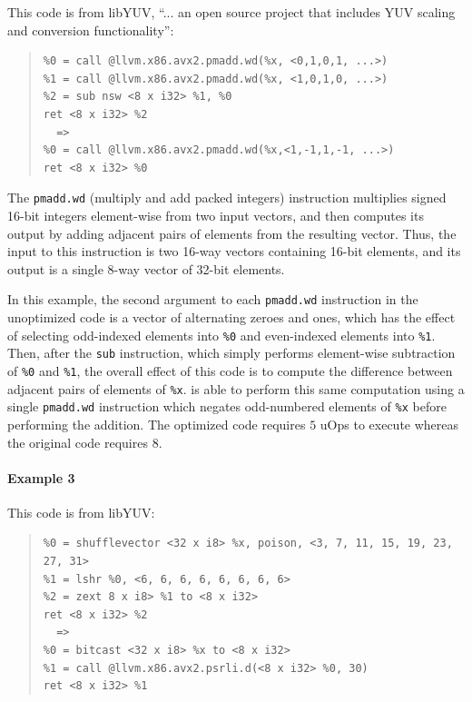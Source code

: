 This code is from libYUV, ``... an open source project that includes
YUV scaling and conversion
functionality'':

{\begin{quote}\begin{verbatim}
%0 = call @llvm.x86.avx2.pmadd.wd(%x, <0,1,0,1, ...>)
%1 = call @llvm.x86.avx2.pmadd.wd(%x, <1,0,1,0, ...>)
%2 = sub nsw <8 x i32> %1, %0
ret <8 x i32> %2
  =>
%0 = call @llvm.x86.avx2.pmadd.wd(%x,<1,-1,1,-1, ...>)
ret <8 x i32> %0
\end{verbatim}
\end{quote}}

The \texttt{pmadd.wd} (multiply and add packed integers) instruction multiplies
signed 16-bit integers element-wise from two input vectors, and then
computes its output by adding adjacent pairs of elements from the
resulting vector.
%
Thus, the input to this instruction is two 16-way vectors containing
16-bit elements, and its output is a single 8-way vector of 32-bit
elements.


In this example, the second argument to each \texttt{pmadd.wd}
instruction in the unoptimized code is a vector of alternating zeroes
and ones, which has the effect of selecting odd-indexed elements into
\texttt{\%0} and even-indexed elements into \texttt{\%1}.
%
Then, after the \texttt{sub} instruction, which simply performs
element-wise subtraction of \texttt{\%0} and \texttt{\%1}, the overall
effect of this code is to compute the difference between adjacent
pairs of elements of \texttt{\%x}.
%
\minotaur{} is able to perform this same computation using a single
\texttt{pmadd.wd} instruction which negates odd-numbered elements of
\texttt{\%x} before performing the addition.
%
The optimized code requires $5$ uOps to execute whereas the original
code requires $8$.


\paragraph*{Example 3}

This code is from libYUV:

{\begin{quote}\begin{verbatim}
%0 = shufflevector <32 x i8> %x, poison, <3, 7, 11, 15, 19, 23, 27, 31>
%1 = lshr %0, <6, 6, 6, 6, 6, 6, 6, 6>
%2 = zext 8 x i8> %1 to <8 x i32>
ret <8 x i32> %2
  =>
%0 = bitcast <32 x i8> %x to <8 x i32>
%1 = call @llvm.x86.avx2.psrli.d(<8 x i32> %0, 30)
ret <8 x i32> %1
\end{verbatim}
\end{quote}}

